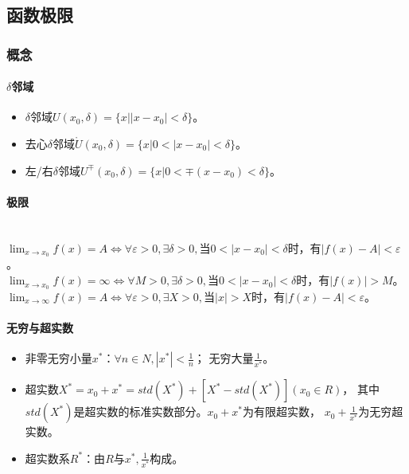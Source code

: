 \documentclass[
12pt, %
a4paper, 
oneside, %
headinclude,footinclude, %
]{scrartcl}
\begin{document}
\subsection{函数极限}
\subsubsection{概念}
\paragraph{$ \delta $邻域}
\begin{itemize}
\item $ \delta $邻域$ U(x_0, \delta) = \{x||x - x_0| < \delta\} $。
\item 去心$ \delta $邻域$ \mathring{U}(x_0, \delta) = \{x|0 < |x -x _0| < \delta\} $。
\item 左/右$ \delta $邻域$ U^{\mp}(x_0, \delta) = \{x|0 < \mp (x - x_0) < \delta\} $。
\end{itemize}
\paragraph{极限}~\\
$ \lim_{x \to x_0} f(x) = A \Leftrightarrow \forall \varepsilon > 0, \exists \delta > 0, $当$ 0 < |x - x_0|< \delta $时，有$ |f(x) - A| < \varepsilon $。 \\
$ \lim_{x \to x_0} f(x) = \infty \Leftrightarrow \forall M > 0, \exists \delta > 0, $当$ 0 < |x - x_0|< \delta $时，有$ |f(x)| > M $。 \\
$ \lim_{x \to \infty} f(x) = A \Leftrightarrow \forall \varepsilon > 0, \exists X > 0, $当$ |x|> X $时，有$ |f(x) - A| < \varepsilon $。
\paragraph{无穷与超实数}
\begin{itemize}
\item 非零无穷小量$ x^* $：$ \forall n \in N, |x^*| < \frac{1}{n} $；
无穷大量$ \frac{1}{x^*} $。
\item 超实数$ X^* = x_0 + x^* = std(X^*) + [X^* - std(X^*)](x_0 \in R) $，
其中$ std(X^*) $是超实数的标准实数部分。$ x_0 + x^* $为有限超实数，
$ x_0 + \frac{1}{x^*} $为无穷超实数。
\item 超实数系$ R^* $：由$ R $与$ x^*, \frac{1}{x^*} $构成。
\end{itemize}
\end{document}
